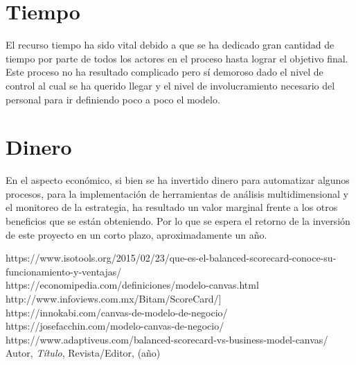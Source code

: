 \section{Tiempo}
\item {El recurso tiempo ha sido vital debido a que se ha dedicado gran cantidad de tiempo por parte de todos los actores en el proceso hasta lograr el objetivo final. Este proceso no ha resultado complicado pero sí demoroso dado el nivel de control al cual se ha querido llegar y el nivel de involucramiento necesario del personal para ir definiendo poco a poco el modelo.}

\section{Dinero}
\item {En el aspecto económico, si bien se ha invertido dinero para automatizar algunos procesos, para la implementación de herramientas de análisis multidimensional y el monitoreo de la estrategia, ha resultado un valor marginal frente a los otros beneficios que se están obteniendo. Por lo que se espera el retorno de la inversión de este proyecto en un corto plazo, aproximadamente un año.}


\begin{thebibliography}{99}
https://www.isotools.org/2015/02/23/que-es-el-balanced-scorecard-conoce-su-funcionamiento-y-ventajas/\\
https://economipedia.com/definiciones/modelo-canvas.html\\
http://www.infoviews.com.mx/Bitam/ScoreCard/]\\
https://innokabi.com/canvas-de-modelo-de-negocio/\\
https://josefacchin.com/modelo-canvas-de-negocio/\\
https://www.adaptiveus.com/balanced-scorecard-vs-business-model-canvas/\\

 Autor, \emph{Título}, Revista/Editor, (año)

\end{thebibliography}


